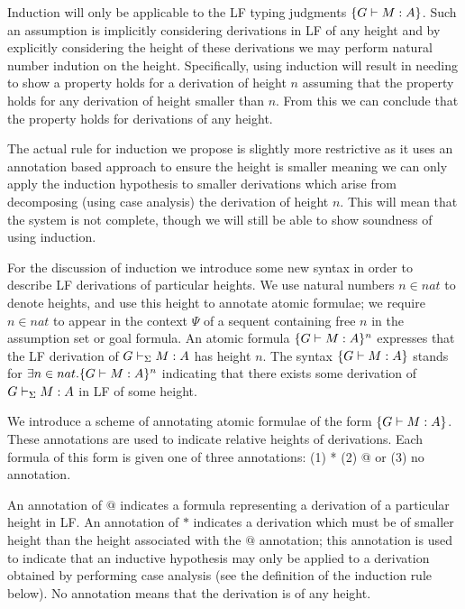 \documentclass[11pt]{article}
\begin{document}
Induction will only be applicable to the LF typing judgments
$\{G \vdash M:A\}$.
%
Such an assumption is implicitly considering derivations in LF of any
height and by explicitly considering the height of these derivations
we may perform natural number indution on the height.
%
Specifically, using induction will result in needing to show a
property holds for a derivation of height $n$ assuming that the
property holds for any derivation of height smaller than $n$.
%
From this we can conclude that the property holds for derivations of
any height.

The actual rule for induction we propose is slightly more restrictive
as it uses an annotation based approach to ensure the height is
smaller meaning we can only apply the induction hypothesis to smaller
derivations which arise from decomposing (using case analysis) the
derivation of height $n$.
%
This will mean that the system is not complete, though we will still
be able to show soundness of using induction.

\begin{definition}
For the discussion of induction we introduce some new syntax in order
to describe LF derivations of particular heights.
%
We use natural numbers $n\in nat$ to denote heights, and use this
height to annotate atomic formulae; we require $n\in nat$ to appear in
the context $\Psi$ of a sequent containing free $n$ in the assumption
set or goal formula.
%
An atomic formula $\{G \vdash M:A\}^n$ expresses that the LF derivation
of $G \vdash_{\Sigma} M:A$ has height $n$.
%
The syntax $\{G \vdash M:A\}$ stands for 
$\exists n\in nat. \{G \vdash M:A\}^n$ indicating that there exists
some derivation of $G \vdash_{\Sigma} M:A$ in LF of some height.
\end{definition}

\begin{definition}[Annotations]
We introduce a scheme of annotating atomic formulae of the form
$\{G \vdash M:A\}$.
%
These annotations are used to indicate relative heights of
derivations.
%
Each formula of this form is given one of three annotations: (1) * (2)
@ or (3) no annotation.

An annotation of $@$ indicates a formula representing a derivation of
a particular height in LF.
%
An annotation of $*$ indicates a derivation which must be of smaller
height than the height associated with the $@$ annotation; this
annotation is used to indicate that an inductive hypothesis may only
be applied to a derivation obtained by performing case analysis (see
the definition of the induction rule below).
%
No annotation means that the derivation is of any height.
\end{definition}
\end{document}
